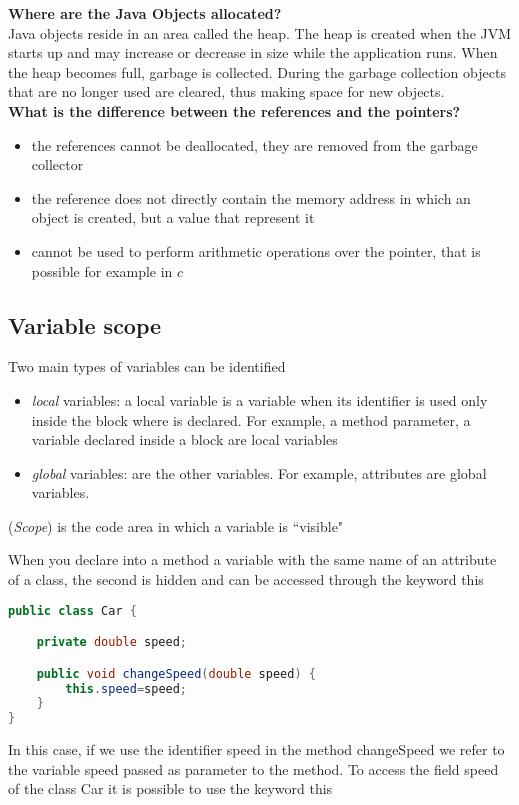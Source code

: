 \documentclass{article}
\begin{document}
\textbf{Where are the Java Objects allocated?}\\
Java objects reside in an area called the heap. The heap is created when the JVM starts up and may increase or decrease in size while the application runs. When the heap becomes full, garbage is collected. During the garbage collection objects that are no longer used are cleared, thus making space for new objects.\\

\textbf{What is the difference between the references and the pointers?}
\begin{itemize}
\item the references cannot be deallocated, they are removed from the garbage collector
\item the reference does not directly contain the memory address in which an object is created, but a value that represent it
\item cannot be used to perform arithmetic operations over the pointer, that is possible for example in $c$
\end{itemize}

\subsection{Variable scope}
Two main types of variables can be identified
\begin{itemize}
\item \emph{local} variables: a local variable is a variable when its identifier is used only inside the block where is declared.
For example, a method parameter, a variable declared inside a block are local variables
\item \emph{global} variables: are the other variables. For example, attributes are global variables.
\end{itemize}

\begin{mydef} (\emph{Scope}) is the code area in which a variable is ``visible"
\end{mydef}
When you declare into a method a variable with the same name of an attribute of a class, the second is hidden and can be accessed through the keyword this
\begin{lstlisting}[language=Java,escapechar=|]
public class Car {

	private double speed;

	public void changeSpeed(double speed) {
        this.speed=speed;   
   	}
}
\end{lstlisting}
In this case, if we use the identifier speed in the method changeSpeed we refer to the variable speed passed as parameter to the method. To access the field speed of the class Car it is possible to use the keyword this
\end{document}

